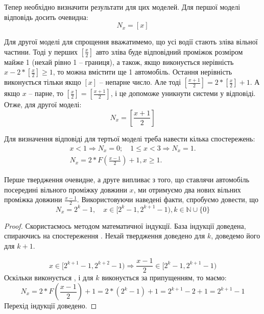 Тепер необхідно визначити результати для цих моделей. Для першої моделі відповідь досить очевидна:
\begin{equation}
	\label{eq:upperbound}
	N_{x}=[x]
\end{equation}

Для другої моделі для спрощення вважатимемо, що усі водії стають зліва вільної частини. Тоді у перших $[\frac x2]$ авто зліва буде відповідний проміжок розміром майже 1 (нехай рівно 1 – границя), а також, якщо виконується нерівність $x - 2 * [\frac x2] \geq 1$, то можна вмістити ще 1 автомобіль. Остання нерівність виконується тільки якщо $[x]$ – непарне число. Але тоді $[\frac{x+1}{2}] = 2 * [\frac{x}{2}] + 1$. А якщо $x$ – парне, то $[\frac{x}{2}] = [\frac{x+1}{2}]$, і це допоможе уникнути системи у відповіді. Отже, для другої моделі:
\begin{equation}
	\label{eq:lowerbound}
	N_{x}=\left[\frac{x+1}{2}\right]
\end{equation}

Для визначення відповіді для тертьої моделі треба навести кілька спостережень:
\begin{gather}
	x < 1 \Rightarrow N_{x}=0;\quad 1 \leq x < 3 \Rightarrow N_{x} = 1.\label{eq:part_case_prop1}\\
	N_{x} = 2 * F\left(\frac{x-1}{2}\right) + 1, x \geq 1.\label{eq:part_case_prop2}
\end{gather}

Перше твердження очевидне, а друге випливає з того, що ставлячи автомобіль посередині вільного проміжку довжини $x$, ми отримуємо два
нових вільних проміжка довжини $\frac{x-1}{2}$. Використовуючи наведені факти,
спробуємо довести, що
\begin{equation}
	N_{x} = 2^k - 1,\quad x \in [2^k - 1, 2^{k+1} - 1), k \in \mathbb{N} \cup \{0\} \label{eq:part_case_res3}
\end{equation}

\begin{proof}
	Скористаємось методом математичної індукції. База індукції доведена, спираючись на спостереження . Нехай твердження доведено для $k$, доведемо його для $k+1$.
	
	\begin{equation}
		x \in [2^{k+1} - 1, 2^{k+2} - 1) \Rightarrow \frac{x-1}{2} \in [2^k - 1, 2^{k+1} - 1)
	\end{equation}
	Оскільки виконується , і для $k$ виконується  за припущенням, то маємо:
	\begin{equation}
		N_{x} = 2 * F\left(\frac{x-1}{2}\right) + 1 = 2 * (2^k - 1) + 1 = 2^{k+1} - 2 + 1 = 2^{k+1} - 1
	\end{equation}
	Перехід індукції доведено.
\end{proof}
